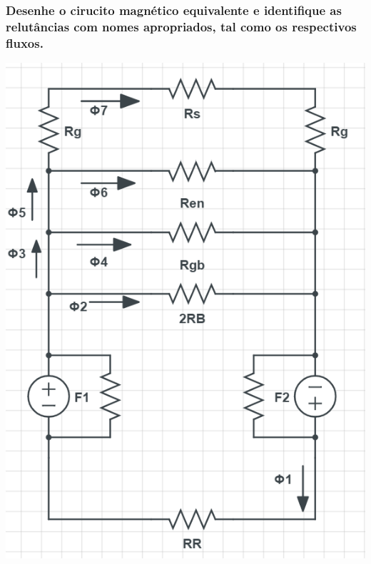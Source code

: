 \documentclass{article}
\begin{document}
\subsubsection{Desenhe o cirucito magnético equivalente e identifique as relutâncias com nomes apropriados, tal como os respectivos fluxos.}
\includegraphics[scale=0.75]{66}
\end{document}
